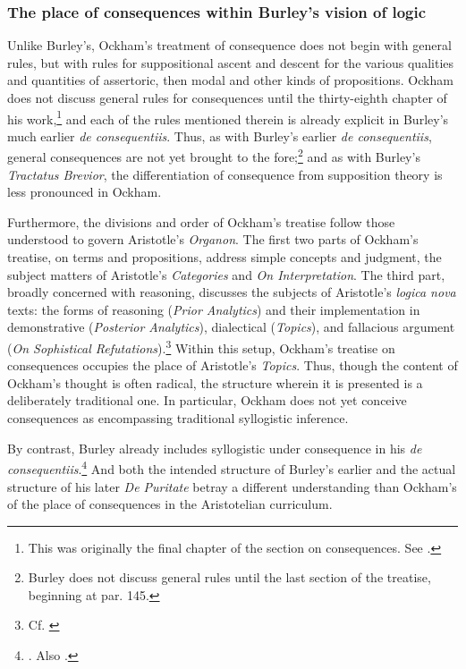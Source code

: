 	\subsubsection{The place of consequences within Burley's vision of logic}
	Unlike Burley's, Ockham's treatment of consequence does not begin with general rules, but with rules for suppositional ascent and descent for the various qualities and quantities of assertoric, then modal and other kinds of propositions. Ockham does not discuss general rules for consequences until the thirty-eighth chapter of his work,\footnote{This was originally the final chapter of the section on consequences. See \autocite[pp. 41*-43*]{OckhamSL}.} and each of the rules mentioned therein is already explicit in Burley's much earlier \textit{de consequentiis}. Thus, as with Burley's earlier \textit{de consequentiis},  general consequences are not yet brought to the fore;\footnote{Burley does not discuss general rules until the last section of the treatise, beginning at par. 145.} and as with Burley's \textit{Tractatus Brevior}, the differentiation of consequence from supposition theory is less pronounced in Ockham.
	
	Furthermore, the divisions and order of Ockham's treatise follow those understood to govern Aristotle's \textit{Organon}. The first two parts of Ockham's treatise, on terms and propositions, address simple concepts and judgment, the subject matters of Aristotle's \textit{Categories} and \textit{On Interpretation}. The third part, broadly concerned with reasoning, discusses the subjects of Aristotle's \textit{logica nova} texts: the forms of reasoning (\textit{Prior Analytics}) and their implementation in demonstrative (\textit{Posterior Analytics}), dialectical (\textit{Topics}), and fallacious argument (\textit{On Sophistical Refutations}).\footnote{Cf. \cite[prol.]{AquinasPA}} Within this setup, Ockham's treatise on consequences occupies the place of Aristotle's \textit{Topics}. Thus, though the content of Ockham's thought is often radical, the structure wherein it is presented is a deliberately traditional one. In particular, Ockham does not yet conceive consequences as encompassing traditional syllogistic inference.
	
	By contrast, Burley already includes syllogistic under consequence in his \textit{de consequentiis}.\footnote{\cite[pp. 131-132, par. 82-85]{Green-Pedersen1980b}. Also \cite[p. 219.19-32]{BurleyDPAL}.} And both the intended structure of Burley's earlier and the actual structure of his later \textit{De Puritate} betray a different understanding than Ockham's of the place of consequences in the Aristotelian curriculum.
	
